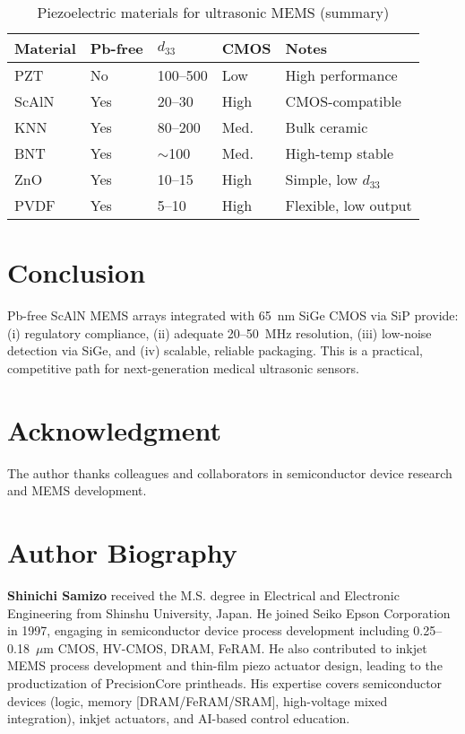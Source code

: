 \documentclass[conference]{IEEEtran}
\begin{document}
\begin{table}[!b]
\caption{Piezoelectric materials for ultrasonic MEMS (summary)}
\label{tab:mat}
\centering
\begin{tabular}{@{}lllll@{}}
\toprule
Material & Pb-free & $d_{33}$ & CMOS & Notes\\
\midrule
PZT  & No  & 100--500 & Low  & High performance\\
ScAlN& Yes & 20--30   & High & CMOS-compatible\\
KNN  & Yes & 80--200  & Med. & Bulk ceramic\\
BNT  & Yes & $\sim$100& Med. & High-temp stable\\
ZnO  & Yes & 10--15   & High & Simple, low $d_{33}$\\
PVDF & Yes & 5--10    & High & Flexible, low output\\
\bottomrule
\end{tabular}
\end{table}

\section{Conclusion}
Pb-free ScAlN MEMS arrays integrated with 65~nm SiGe CMOS via SiP provide: (i) regulatory compliance, (ii) adequate 20--50~MHz resolution, (iii) low-noise detection via SiGe, and (iv) scalable, reliable packaging. This is a practical, competitive path for next-generation medical ultrasonic sensors.

\FloatBarrier

\section*{Acknowledgment}
The author thanks colleagues and collaborators in semiconductor device research and MEMS development.




\section*{Author Biography}
\textbf{Shinichi Samizo} received the M.S. degree in Electrical and Electronic Engineering from Shinshu University, Japan. He joined Seiko Epson Corporation in 1997, engaging in semiconductor device process development including 0.25--0.18~$\mu$m CMOS, HV-CMOS, DRAM, FeRAM. He also contributed to inkjet MEMS process development and thin-film piezo actuator design, leading to the productization of PrecisionCore printheads. His expertise covers semiconductor devices (logic, memory [DRAM/FeRAM/SRAM], high-voltage mixed integration), inkjet actuators, and AI-based control education.
\end{document}
